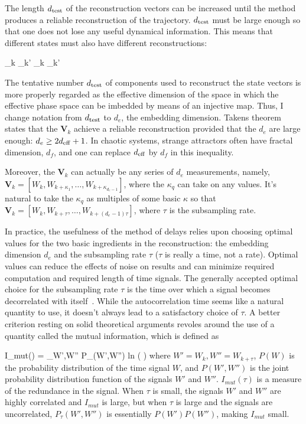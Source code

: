 The length $d_{\rm{test}}$ of the reconstruction vectors can be increased until the method produces a reliable reconstruction of the trajectory. $d_{\rm{test}}$ must be large enough so that one does
not lose any useful dynamical information. This means that different states must also have different reconstructions:

\beq
\label{diff_recons}
{}_k _{k'} _k _{k'}
\eeq

The tentative number $d_{\rm{test}}$ of components used to reconstruct the state vectors is more properly regarded as the effective dimension of the space in which the effective phase space
can be imbedded by means of an injective map. Thus, I change notation from $d_{\rm{test}}$ to $d_e$, the embedding dimension. Takens theorem states that the ${\mathbf{V}}_k$ achieve
a reliable reconstruction provided that the $d_e$ are large enough: $d_e \ge 2 d_{\rm{eff}} + 1$. In chaotic systems, strange attractors often have fractal dimension, $d_f$, and one can
replace $d_{\rm{eff}}$ by $d_f$ in this inequality.

Moreover, the ${\mathbf{V}}_k$ can actually be any series of $d_e$ measurements, namely, ${\mathbf{V}}_k = [W_k, W_{k + \kappa_1}, \ldots, W_{k + \kappa_{d_e-1}}]$, where the $\kappa_q$ can take on
any values. It's natural to take the $\kappa_q$ as multiples of some basic $\kappa$ so that ${\mathbf{V}}_k = [W_k, W_{k + \tau}, \ldots, W_{k + (d_e-1)\tau}]$, where $\tau$ is the subsampling
rate.

In practice, the usefulness of the method of delays relies upon choosing optimal values for the two basic ingredients in the reconstruction: 
the embedding dimension $d_e$ and the subsampling rate $\tau$ ($\tau$ is really a time, not a rate). 
Optimal values can reduce the effects of noise on results and can minimize required computation and required length of time signals.
The generally accepted optimal choice for the subsampling rate $\tau$ is the time over which a signal becomes decorrelated with itself~\cite{manneville2004,riedle2013}.
While the autocorrelation time seems like a natural quantity to use, it doesn't always lead to a satisfactory choice of $\tau$. A better criterion resting on solid theoretical arguments
revoles around the use of a quantity called the mutual information, which is defined as

\beq
\label{mutual_info}
I_{mut}(\tau) = \sum_{W',W''} P_{\tau}(W',W'') \rm{ln} \left(   \right)
\eeq
where $W' = W_k, W'' = W_{k+\tau}$, $P(W)$ is the probability distribution of the time signal $W$, and $P(W',W'')$ is the joint probability distribution function of the signals $W'$ and $W''$.
$I_{mut}(\tau)$ is a measure of the redundance in the signal. When $\tau$ is small, the signals $W'$ and $W''$ are highly correlated and $I_{mut}$ is large, but when $\tau$ is large and the
signals are uncorrelated, $P_{\tau}(W',W'')$ is essentially $P(W') P(W'')$, making $I_{mut}$ small.

